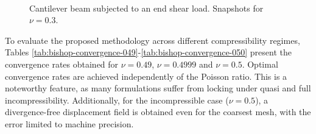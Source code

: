 \documentclass[english,11pt,3p,number,sort&compress]{elsarticle}
\begin{document}
\begin{figure}[H]
    \centering
     \hfill
     \\
     \hfill
    \caption{Cantilever beam subjected to an end shear load. Snapshots for $\nu=0.3$.}
    \label{fig:bishop-snapshot}
\end{figure}

To evaluate the proposed methodology across different compressibility regimes, Tables \ref{tab:bishop-convergence-049}-\ref{tab:bishop-convergence-050} present the convergence rates obtained for $\nu=0.49$, $\nu=0.4999$ and $\nu=0.5$. Optimal convergence rates are achieved independently of the Poisson ratio. This is a noteworthy feature, as many formulations suffer from locking under quasi and full incompressibility. Additionally, for the incompressible case ($\nu=0.5$), a divergence-free displacement field is obtained even for the coarsest mesh, with the error limited to machine precision.
\end{document}
